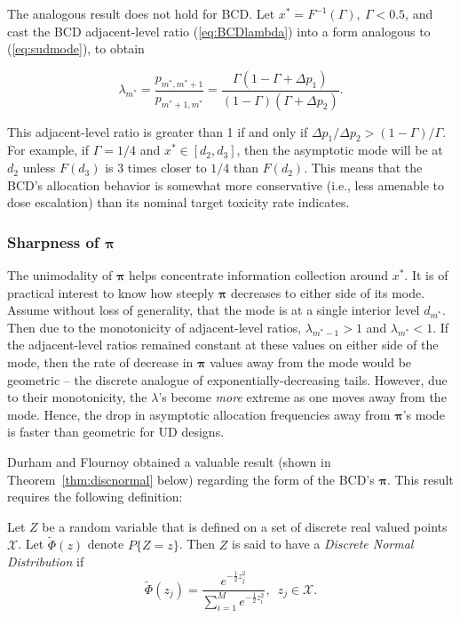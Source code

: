 The analogous result does not hold for BCD. Let $x^*=F^{-1}(\Gamma),\ \Gamma<0.5$, and cast the BCD adjacent-level ratio (\ref{eq:BCDlambda}) into a form analogous to (\ref{eq:sudmode}), to obtain

\begin{equation*}
\lambda_{m^*}=\frac{p_{m^*,m^*+1}}{p_{m^*+1,m^*}}=\frac{\Gamma\left(1-\Gamma+\Delta p_1\right)}{(1-\Gamma)\left(\Gamma+\Delta p_2\right)}.
\end{equation*}

\noindent This adjacent-level ratio is greater than 1 if and only if $\Delta p_1/\Delta p_2>(1-\Gamma)/\Gamma$. For example, if $\Gamma=1/4$ and $x^*\in\left[d_2,d_3\right]$, then the asymptotic mode will be at $d_2$ unless $F\left(d_3\right)$ is 3 times closer to $1/4$ than $F\left(d_2\right)$. This means that the BCD's allocation behavior is somewhat more conservative (i.e., less amenable to dose escalation) than its nominal target toxicity rate indicates.

\subsubsection{Sharpness of $\boldsymbol{\pi}$}

The unimodality of $\boldsymbol{\pi}$ helps concentrate information collection around $x^*$. It is of practical interest to know how steeply $\boldsymbol{\pi}$ decreases to either side of its mode. Assume without loss of generality, that the mode is at a single interior level $d_{m^*}$. Then due to the monotonicity of adjacent-level ratios, $\lambda_{m^*-1}>1$ and $\lambda_{m^*}<1$. If the adjacent-level ratios remained constant at these values on either side of the mode, then the rate of decrease in $\boldsymbol{\pi}$ values away from the mode would be geometric -- the discrete analogue of exponentially-decreasing tails. However, due to their monotonicity, the $\lambda$'s become \emph{more} extreme as one moves away from the mode. Hence, the drop in asymptotic allocation frequencies away from $\boldsymbol{\pi}$'s mode is faster than geometric for UD designs.

Durham and Flournoy \cite{Durh:Flou:rand:1994} obtained a valuable result (shown in Theorem~\ref{thm:discnormal} below) regarding the form of the BCD's $\boldsymbol{\pi}$. This result requires the following definition:

\begin{defn}
Let $Z$ be a random variable that is defined on a set of discrete
real valued points $\mathcal{X}$.  Let $\tilde{\Phi}(z)$ denote $P\{Z=z\}$.  Then $Z$ is said to have a \emph{Discrete Normal Distribution} if
\begin{equation*}
\tilde{\Phi}(z_j)=\frac{e^{-\frac{1}{2}z_j^2}}{\sum_{i=1}^Me^{-\frac{1}{2}z_i^2}},\,\,\,z_j\in\mathcal{X}.
\end{equation*}
\end{defn}


